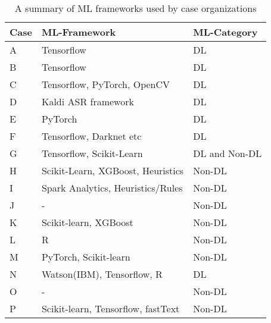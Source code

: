 \begin{table}[h]
  \centering
  \caption{A summary of ML frameworks used by case organizations}
    \begin{tabular}{lll}
    \hline
    Case & ML-Framework & ML-Category \\
    \hline
    A & Tensorflow & DL \\
    B & Tensorflow & DL \\
    C & Tensorflow, PyTorch, OpenCV & DL \\
    D & Kaldi ASR framework  & DL \\
    E & PyTorch & DL \\
    F & Tensorflow, Darknet etc & DL \\
    G & Tensorflow, Scikit-Learn & DL and Non-DL \\
    H & Scikit-Learn, XGBoost, Heuristics & Non-DL \\
    I & Spark Analytics, Heuristics/Rules & Non-DL \\
    J & - & Non-DL \\
    K & Scikit-learn, XGBoost & Non-DL \\
    L & R & Non-DL \\
    M & PyTorch, Scikit-learn & Non-DL \\
    N & Watson(IBM), Tensorflow, R & DL \\
    O & - & Non-DL \\
    P & Scikit-learn, Tensorflow, fastText & Non-DL \\
    \hline
    \end{tabular}%
  \label{tab:ml_frameworks}%
\end{table}%
